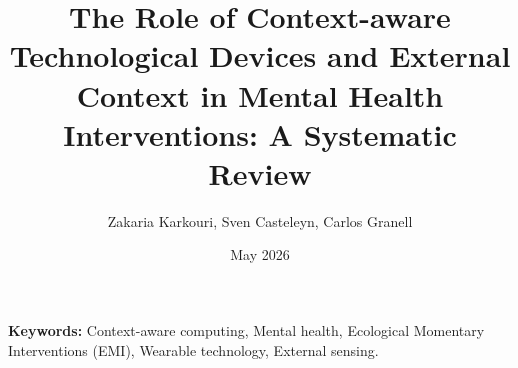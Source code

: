 \documentclass[12pt,a4paper]{article}
\title{\textbf{The Role of Context-aware Technological Devices and External Context in Mental Health Interventions: A Systematic Review}}
\author{Zakaria Karkouri, Sven Casteleyn, Carlos Granell}
\date{May 2026}
\begin{document}
\maketitle



\vspace{1em}
\noindent \textbf{Keywords:} Context-aware computing, Mental health, Ecological Momentary Interventions (EMI), Wearable technology, External sensing.
\vspace{2em}





%

\clearpage



\clearpage

\end{document}
